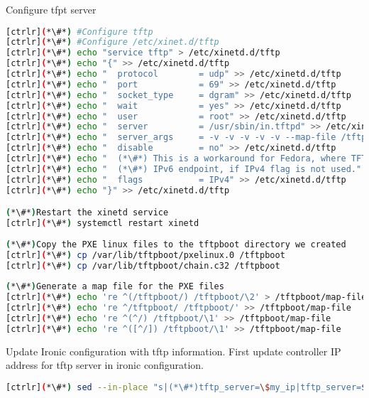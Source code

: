 Configure tfpt server


\begin{lstlisting}[language=bash,keywords={}]
[ctrlr](*\#*) #Configure tftp 
[ctrlr](*\#*) #Configure /etc/xinet.d/tftp
[ctrlr](*\#*) echo "service tftp" > /etc/xinetd.d/tftp
[ctrlr](*\#*) echo "{" >> /etc/xinetd.d/tftp
[ctrlr](*\#*) echo "  protocol        = udp" >> /etc/xinetd.d/tftp
[ctrlr](*\#*) echo "  port            = 69" >> /etc/xinetd.d/tftp
[ctrlr](*\#*) echo "  socket_type     = dgram" >> /etc/xinetd.d/tftp
[ctrlr](*\#*) echo "  wait            = yes" >> /etc/xinetd.d/tftp
[ctrlr](*\#*) echo "  user            = root" >> /etc/xinetd.d/tftp
[ctrlr](*\#*) echo "  server          = /usr/sbin/in.tftpd" >> /etc/xinetd.d/tftp
[ctrlr](*\#*) echo "  server_args     = -v -v -v -v -v --map-file /tftpboot/map-file /tftpboot" >> /etc/xinetd.d/tftp
[ctrlr](*\#*) echo "  disable         = no" >> /etc/xinetd.d/tftp
[ctrlr](*\#*) echo "  (*\#*) This is a workaround for Fedora, where TFTP will listen only on" >> /etc/xinetd.d/tftp
[ctrlr](*\#*) echo "  (*\#*) IPv6 endpoint, if IPv4 flag is not used." >> /etc/xinetd.d/tftp
[ctrlr](*\#*) echo "  flags           = IPv4" >> /etc/xinetd.d/tftp
[ctrlr](*\#*) echo "}" >> /etc/xinetd.d/tftp

(*\#*)Restart the xinetd service
[ctrlr](*\#*) systemctl restart xinetd
    
(*\#*)Copy the PXE linux files to the tftpboot directory we created
[ctrlr](*\#*) cp /var/lib/tftpboot/pxelinux.0 /tftpboot
[ctrlr](*\#*) cp /var/lib/tftpboot/chain.c32 /tftpboot
    
(*\#*)Generate a map file for the PXE files
[ctrlr](*\#*) echo 're ^(/tftpboot/) /tftpboot/\2' > /tftpboot/map-file
[ctrlr](*\#*) echo 're ^/tftpboot/ /tftpboot/' >> /tftpboot/map-file
[ctrlr](*\#*) echo 're ^(^/) /tftpboot/\1' >> /tftpboot/map-file
[ctrlr](*\#*) echo 're ^([^/]) /tftpboot/\1' >> /tftpboot/map-file
\end{lstlisting} 


Update Ironic configuration with tftp information. First update controller IP address for tftp server in ironic configuration.


\begin{lstlisting}[language=bash,keywords={}]
[ctrlr](*\#*) sed --in-place "s|(*\#*)tftp_server=\$my_ip|tftp_server=${controller_ip}|" /etc/ironic/ironic.conf
\end{lstlisting} 

